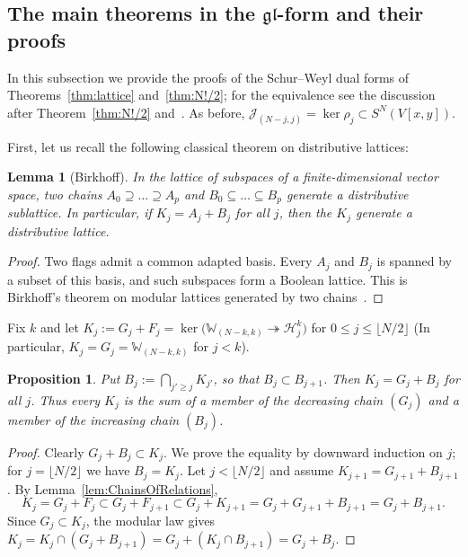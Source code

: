 \documentclass[11pt]{amsart}
\numberwithin{equation}{section}
\newtheorem{proposition}[equation]{Proposition}
\newtheorem{lemma}[equation]{Lemma}
\theoremstyle{definition}
\newcommand{\gl}{\mathfrak{gl}}
\newcommand{\bW}{\mathbb{W}}          %
\newcommand{\cJ}{\mathcal{J}}
\begin{document}
	
	
	\subsection{The main theorems in the $\gl$-form and their proofs}\label{ssec:proofs}
	
	In this subsection we provide the proofs of the Schur--Weyl dual forms of Theorems~\ref{thm:lattice} and~\ref{thm:N!/2}; for the equivalence see the discussion after Theorem~\ref{thm:N!/2} and~\cite[\S3.3]{KM}. As before, $\cJ_{(N-j,j)}=\ker\rho_j\subset S^N(V[x,y])$.
	
	
	First, let us recall the following classical theorem on distributive lattices:
	\begin{lemma}[Birkhoff]\label{lem:birkhoff}
		In the lattice of subspaces of a finite-dimensional vector space, two chains $A_0\supseteq\dots\supseteq A_p$ and $B_0\subseteq\dots\subseteq B_p$ generate a distributive sublattice. In particular, if $K_j=A_j+B_j$ for all $j$, then the $K_j$ generate a distributive lattice.
	\end{lemma}
	\begin{proof}
		Two flags admit a common adapted basis. Every $A_j$ and $B_j$ is spanned by a subset of this basis, and such subspaces form a Boolean lattice. This is Birkhoff's theorem on modular lattices generated by two chains~\cite{Birkhoff}.
	\end{proof}
	
	
	Fix $k$ and let $K_j:=G_j+F_j=\ker\big(\bW_{(N-k,k)}\twoheadrightarrow\mathcal H_j^k\big)$ for $0\le j\le\lfloor N/2\rfloor$ (In particular, $K_j=G_j=\bW_{(N-k,k)}$ for $j<k$).
	
	\begin{proposition}\label{thm:two-chains}
		Put $B_j:=\bigcap_{j'\ge j}K_{j'}$, so that $B_j\subset B_{j+1}$. Then $K_j=G_j+B_j$ for all $j$. Thus every $K_j$ is the sum of a member of the decreasing chain $(G_j)$ and a member of the increasing chain $(B_j)$.
	\end{proposition}
	\begin{proof}
		Clearly $G_j+B_j\subset K_j$. We prove the equality by downward induction on $j$; for $j=\lfloor N/2\rfloor$ we have $B_j=K_j$. Let $j<\lfloor N/2\rfloor$ and assume $K_{j+1}=G_{j+1}+B_{j+1}$. By Lemma~\ref{lem:ChainsOfRelations},
		\[
		K_j=G_j+F_j\subset G_j+F_{j+1}\subset G_j+K_{j+1}=G_j+G_{j+1}+B_{j+1}=G_j+B_{j+1}.
		\]
		Since $G_j\subset K_j$, the modular law gives $K_j=K_j\cap(G_j+B_{j+1})=G_j+(K_j\cap B_{j+1})=G_j+B_j$.
	\end{proof}
	
\end{document}
